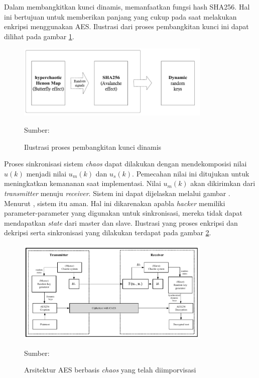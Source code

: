 Dalam membangkitkan kunci dinamis, \textcite{lin2021} memanfaatkan fungsi hash SHA256. Hal ini bertujuan untuk memberikan panjang yang cukup pada saat melakukan enkripsi menggunakan AES. Ilustrasi dari proses pembangkitan kunci ini dapat dilihat pada gambar \ref{fig:lin.keygen}.

\begin{figure}[!h]
  \centering
  \includegraphics[width=350px]{chapters/res/chapter-2/img/lin.keygen.png}
  \caption{Ilustrasi proses pembangkitan kunci dinamis} \label{fig:lin.keygen}
  Sumber: \textcite{lin2021}
\end{figure}

Proses sinkronisasi sistem \emph{chaos} dapat dilakukan dengan mendekomposisi nilai $u(k)$ menjadi nilai $u_m(k)$ dan $u_s(k)$. Pemecahan nilai ini ditujukan untuk meningkatkan kemananan saat implementasi. Nilai $u_m(k)$ akan dikirimkan dari \emph{transmitter} menuju \emph{receiver}. Sistem ini dapat dijelaskan melalui gambar . Menurut \textcite{lin2021}, sistem itu aman. Hal ini dikarenakan apabla \emph{hacker} memiliki parameter-parameter yang digunakan untuk sinkronisasi, mereka tidak dapat mendapatkan \emph{state} dari master dan slave. Ilustrasi yang proses enkripsi dan dekripsi serta sinkronisasi yang dilakukan terdapat pada gambar \ref{fig:lin.caes}.

\begin{figure}[!h]
  \centering
  \includegraphics[width=350px]{chapters/res/chapter-2/img/lin.caes.png}
  \caption{Arsitektur AES berbasis \emph{chaos} yang telah diimporvisasi} \label{fig:lin.caes}
  Sumber: \textcite{lin2021}
\end{figure}

